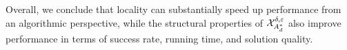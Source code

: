 

Overall, we conclude that locality can substantially speed up performance from an algorithmic perspective, while the structural properties of $\mathcal{X}_{A_d^*}^{\delta,\varepsilon}$ also improve performance in terms of success rate, running time, and solution quality. %




